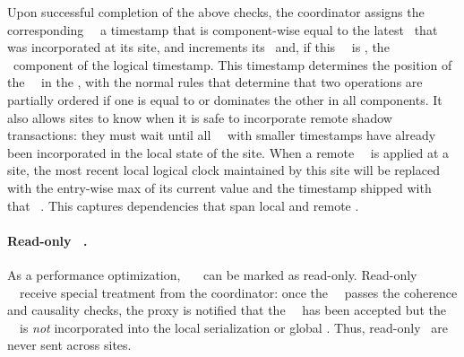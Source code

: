 Upon successful completion of the above checks, the coordinator assigns the 
corresponding \shadow\ \operation\ a timestamp that is com\-po\-nent-wise equal
to the latest \operation\ that was incorporated at its site, and
increments its \blue\ and, if this \shadow\ \operations\ is
  \red, the \red\ component of the logical
timestamp. This timestamp determines the position of the
\shadow\ \operation\ in the \RBo, with the normal rules
that determine that two operations are partially ordered if one is
equal to or dominates the other in all components. It also allows
sites to know when it is safe to incorporate remote shadow
transactions: they must wait until all \shadow\ \transactions\ with
smaller timestamps have already been incorporated in the local state
of the site. When a remote \shadow\ \operation\ is applied at a site, the most recent local logical clock maintained
by this site will be replaced with the entry-wise max of its current value
and the timestamp shipped with that \shadow\ \operation. This captures dependencies that span local and remote \transactions. 


\paragraph{Read-only \shadow\ \operations.} 
 As a performance optimization, \blue\ \shadow\ \operations\ can be
 marked as read-only. Read-only \shadow\ \operations\ receive special
 treatment from the coordinator: once the \initial\ \operation\ passes
 the coherence and causality checks, the proxy is notified that the
 \shadow\ \operation\ has been accepted but the
 \shadow\ \operation\ is {\em not} incorporated into the local
 serialization or global \RBo. Thus, read-only \operations\ are
never sent across sites.


